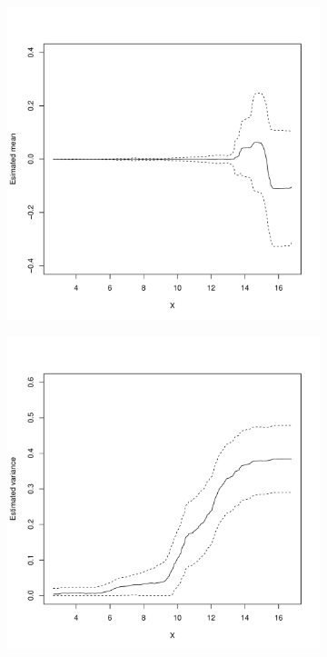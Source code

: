 \documentclass[12pt]{article}
\begin{document}
\begin{figure}
\begin{subfigure}[b]{0.4\textwidth}
        \caption{}
        \label{fig:tb_res}
    \end{subfigure}
    \begin{subfigure}[b]{0.4\textwidth}
        \centering
        \includegraphics[width=\textwidth]{figures_treasury_c.pdf}
        \caption{}
        \label{fig:tb_mean}
    \end{subfigure}
    \hfill
    \begin{subfigure}[b]{0.4\textwidth}
        \centering
        \includegraphics[width=\textwidth]{figures_treasury_d.pdf}

\end{subfigure}
\end{figure}
\end{document}
